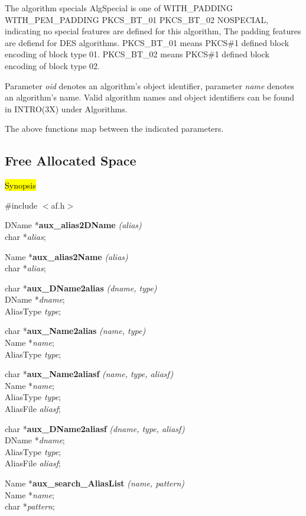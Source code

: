 The algorithm specials AlgSpecial is one of 
\bi
\m WITH\_PADDING
\m WITH\_PEM\_PADDING
\m PKCS\_BT\_01
\m PKCS\_BT\_02
\m NOSPECIAL, indicating no special features are defined for this algorithm,
\ei
The padding features are defiend for DES algorithms. PKCS\_BT\_01 means PKCS\#1
defined block encoding of block type 01. PKCS\_BT\_02 means PKCS\#1 defined block
encoding of block type 02.

Parameter {\em oid} denotes an algorithm's object identifier, parameter
{\em name} denotes an algorithm's name. Valid algorithm names and object 
identifiers can be found in INTRO(3X) under Algorithms.

The above functions map between the indicated parameters.

\subsection{Free Allocated Space}
\label{aux_alias}
\hl{Synopsis}

\#include $<$af.h$>$ 

DName *{\bf aux\_alias2DName} {\em (alias)} \\
char *{\em alias}; 

Name *{\bf aux\_alias2Name} {\em (alias)} \\
char *{\em alias}; 

char *{\bf aux\_DName2alias} {\em (dname, type)} \\
DName *{\em dname}; \\
AliasType {\em type}; 

char *{\bf aux\_Name2alias} {\em (name, type)} \\
Name *{\em name}; \\
AliasType {\em type}; 

char *{\bf aux\_Name2aliasf} {\em (name, type, aliasf)} \\
Name *{\em name}; \\
AliasType {\em type}; \\
AliasFile {\em aliasf};

char *{\bf aux\_DName2aliasf} {\em (dname, type, aliasf)} \\
DName *{\em dname}; \\
AliasType {\em type}; \\
AliasFile {\em aliasf};

Name *{\bf aux\_search\_AliasList} {\em (name, pattern)} \\
Name *{\em name}; \\
char *{\em pattern};


